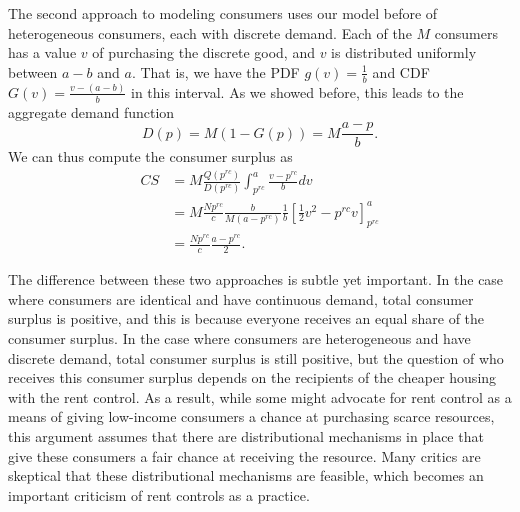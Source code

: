 The second approach to modeling consumers uses our model before of heterogeneous consumers, each with discrete demand. Each of the $M$ consumers has a value $v$ of purchasing the discrete good, and $v$ is distributed uniformly between $a-b$ and $a$. That is, we have the PDF $g(v) = \frac{1}{b}$ and CDF $G(v) = \frac{v-(a-b)}{b}$ in this interval. As we showed before, this leads to the aggregate demand function 
$$D(p) = M(1 - G(p)) = M\frac{a-p}{b}.$$
We can thus compute the consumer surplus as
\begin{align*}
C S&=M \frac{Q\left(p^{r c}\right)}{D\left(p^{r c}\right)} \int_{p^{r c}}^{a} \frac{v-p^{r c}}{b} d v \\
&= M \frac{N p^{r c}}{c} \frac{b}{M\left(a-p^{r c}\right)} \frac{1}{b}\left[\frac{1}{2} v^{2}-p^{r c} v\right]_{p^{r c}}^{a} \\
&= \frac{N p^{r c}}{c} \frac{a-p^{r c}}{2}.
\end{align*}

The difference between these two approaches is subtle yet important. In the case where consumers are identical and have continuous demand, total consumer surplus is positive, and this is because everyone receives an equal share of the consumer surplus. In the case where consumers are heterogeneous and have discrete demand, total consumer surplus is still positive, but the question of who receives this consumer surplus depends on the recipients of the cheaper housing with the rent control. As a result, while some might advocate for rent control as a means of giving low-income consumers a chance at purchasing scarce resources, this argument assumes that there are distributional mechanisms in place that give these consumers a fair chance at receiving the resource. Many critics are skeptical that these distributional mechanisms are feasible, which becomes an important criticism of rent controls as a practice.

